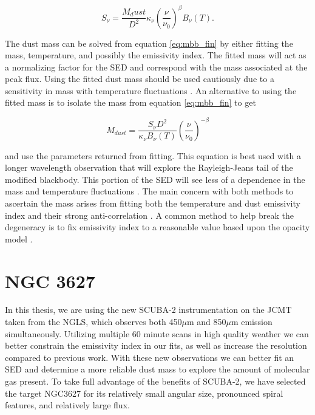 \begin{equation}\label{eq:mbb_fin}
  S_\nu=\frac{M_dust}{D^2}\kappa_\nu\left(\frac{\nu}{\nu_0}\right)^\beta B_\nu\left(T\right).
\end{equation}

The dust mass can be solved from equation \ref{eq:mbb_fin} by either fitting the mass, temperature, and possibly the emissivity index.  The fitted mass will act as a normalizing factor for the SED and correspond with the mass associated at the peak flux.  Using the fitted dust mass should be used cautiously due to a sensitivity in mass with temperature fluctuations \citep{draine2007}. An alternative to using the fitted mass is to isolate the mass from equation \ref{eq:mbb_fin} to get 

\begin{equation}\label{eq:mbb_mass}
  M_{dust} = \frac{S_\nu D^2}{\kappa_\nu B_\nu\left(T\right)}\left(\frac{\nu}{\nu_0}\right)^{-\beta}
\end{equation}

and use the parameters returned from fitting.  This equation is best used with a longer wavelength observation that will explore the Rayleigh-Jeans tail of the modified blackbody.  This portion of the SED will see less of a dependence in the mass and temperature fluctuations \citep{draine2007}.  The main concern with both methods to ascertain the mass arises from fitting both the temperature and dust emissivity index and their strong anti-correlation \citep{galametz2012,tabatabaei2014}.  A common method to help break the degeneracy is to fix emissivity index to a reasonable value based upon the opacity model \citep{tabatabaei2014}.

\section{NGC 3627}

In this thesis, we are using the new SCUBA-2 instrumentation on the JCMT taken from the NGLS, which observes both 450$\mu$m and 850$\mu$m emission simultaneously.  Utilizing multiple 60 minute scans in high quality weather we can better constrain the emissivity index in our fits, as well as increase the resolution compared to previous work.  With these new observations we can better fit an SED and determine a more reliable dust mass to explore the amount of molecular gas present.  To take full advantage of the benefits of SCUBA-2, we have selected the target NGC3627 for its relatively small angular size, pronounced spiral features, and relatively large flux.

